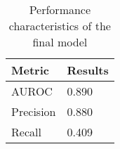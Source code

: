 \begin{table}[H]
    \centering
    \begin{tabular}{@{}ll@{}}
    \toprule
    Metric    & Results \\ \midrule
    AUROC     & 0.890   \\
    Precision & 0.880   \\
    Recall    & 0.409   \\ \bottomrule
    \end{tabular}
    \caption{Performance characteristics of the final model}\label{tab:final-results}
\end{table}
